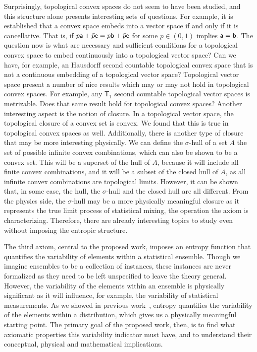 Surprisingly, topological convex spaces do not seem to have been studied, and this structure alone presents interesting sets of questions.  For example, it is established that a convex space embeds into a vector space if and only if it is cancellative. That is, if $p \ens[a] + \bar{p} \ens = p \ens[b] + \bar{p} \ens$ for some $p \in (0,1)$ implies $\ens[a] = \ens[b]$. The question now is what are necessary and sufficient conditions for a topological convex space to embed continuously into a topological vector space? Can we have, for example, an Hausdorff second countable topological convex space that is not a continuous embedding of a topological vector space? Topological vector space present a number of nice results which may or may not hold in topological convex spaces. For example, any $\mathsf{T}_1$ second countable topological vector spaces is metrizable. Does that same result hold for topological convex spaces? Another interesting aspect is the notion of closure. In a topological vector space, the topological closure of a convex set is convex. We found that this is true in topological convex spaces as well. Additionally, there is another type of closure that may be more interesting physically. We can define the $\sigma$-hull of a set $A$ the set of possible infinite convex combinations, which can also be shown to be a convex set. This will be a superset of the hull of $A$, because it will include all finite convex combinations, and it will be a subset of the closed hull of $A$, as all infinite convex combinations are topological limits. However, it can be shown that, in some case, the hull, the $\sigma$-hull and the closed hull are all different. From the physics side, the $\sigma$-hull may be a more physically meaningful closure as it represents the true limit process of statistical mixing, the operation the axiom is characterizing. Therefore, there are already interesting topics to study even without imposing the entropic structure.

The third axiom, central to the proposed work, imposes an entropy function that quantifies the variability of elements within a statistical ensemble. Though we imagine ensembles to be a collection of instances, these instances are never formalized as they need to be left unspecified to leave the theory general. However, the variability of the elements within an ensemble is physically significant as it will influence, for example, the variability of statistical measurements. As we showed in previous work~\cite{Carcassi:2021}, entropy quantifies the variability of the elements within a distribution, which gives us a physically meaningful starting point. The primary goal of the proposed work, then, is to find what axiomatic properties this variability indicator must have, and to understand their conceptual, physical and mathematical implications.

